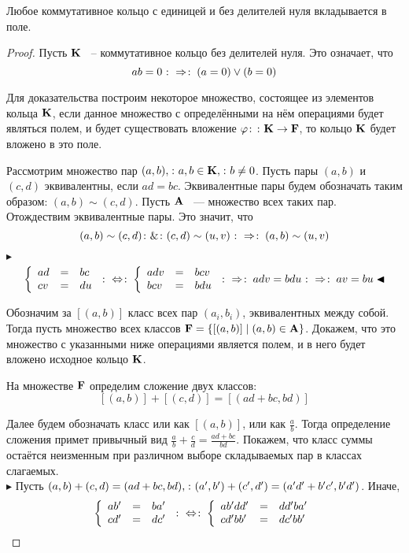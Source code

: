 \begin{theorem}
\label{group:pole}
Любое коммутативное кольцо с единицей и без делителей нуля вкладывается в поле.
\end{theorem}
\begin{proof}
Пусть $\mathbf{K}$ ~-- коммутативное кольцо без делителей нуля. Это означает, что
$$ab=0\mathbin{\colon\Rightarrow \colon} (a=0)\vee(b=0)$$

Для доказательства построим некоторое множество, состоящее из элементов кольца $\mathbf{K}$, если данное множество с определёнными на нём операциями будет являться полем, и будет существовать вложение $\varphi\colon\colon\mathbf{K}\rightarrow \mathbf{F}$, то кольцо $\mathbf{K}$ будет вложено в это поле.

Рассмотрим множество пар $(a,b),\colon a,b\in\mathbf{K},\colon b\ne0$. Пусть пары $(a,b)$ и $(c,d)$ эквивалентны, если $ad=bc$. Эквивалентные пары будем обозначать таким образом: $(a,b)\sim(c,d)$. Пусть $\mathbf{A}$ ~--- множество всех таких пар. Отождествим эквивалентные пары. Это значит, что $$(a,b)\sim(c,d)\colon\&\colon(c,d)\sim(u,v)\mathbin{\colon\Rightarrow \colon}(a,b)\sim(u,v)$$

$\blacktriangleright$
$$
\left\{
\begin{array}{lll}
ad&=&bc\\
cv&=&du
\end{array}
\right.
\mathbin{\colon\Leftrightarrow\colon}
\left\{
\begin{array}{lll}
adv&=&bcv\\
bcv&=&bdu
\end{array}
\right.
\mathbin{\colon\Rightarrow \colon} adv=bdu \mathbin{\colon\Rightarrow \colon} av=bu \blacktriangleleft
$$

Обозначим за $[(a,b)]$ класс всех пар $(a_i,b_i)$, эквивалентных между собой. Тогда пусть множество всех классов $\mathbf{F}=\{ [(a,b)] \mid (a,b)\in \mathbf{A}\}$. Докажем, что это множество с указанными ниже операциями является полем, и в него будет вложено исходное кольцо $\mathbf{K}$. 

На множестве $\mathbf{F}$ определим сложение двух классов:
$$[(a,b)]+[(c,d)]=[(ad+bc,bd)]$$

Далее будем обозначать класс или как $[(a,b)]$, или как $\frac{a}{b}$. Тогда определение сложения примет привычный вид $\frac{a}{b}+\frac{c}{d}=\frac{ad+bc}{bd}$. Покажем, что класс суммы остаётся неизменным при различном выборе складываемых пар в классах слагаемых.\\

$\blacktriangleright$
Пусть $(a,b)+(c,d)=(ad+bc,bd),\colon(a',b')+(c',d') = (a'd'+b'c',b'd')$. Иначе, 
$$
\left\{
\begin{array}{lll}
ab'&=&ba'\\
cd'&=&dc'
\end{array}
\right.
\mathbin{\colon\Leftrightarrow\colon}
\left\{
\begin{array}{lll}
ab'dd'&=&dd'ba'\\
cd'bb'&=&dc'bb'
\end{array}
\right.
$$


\end{proof}
